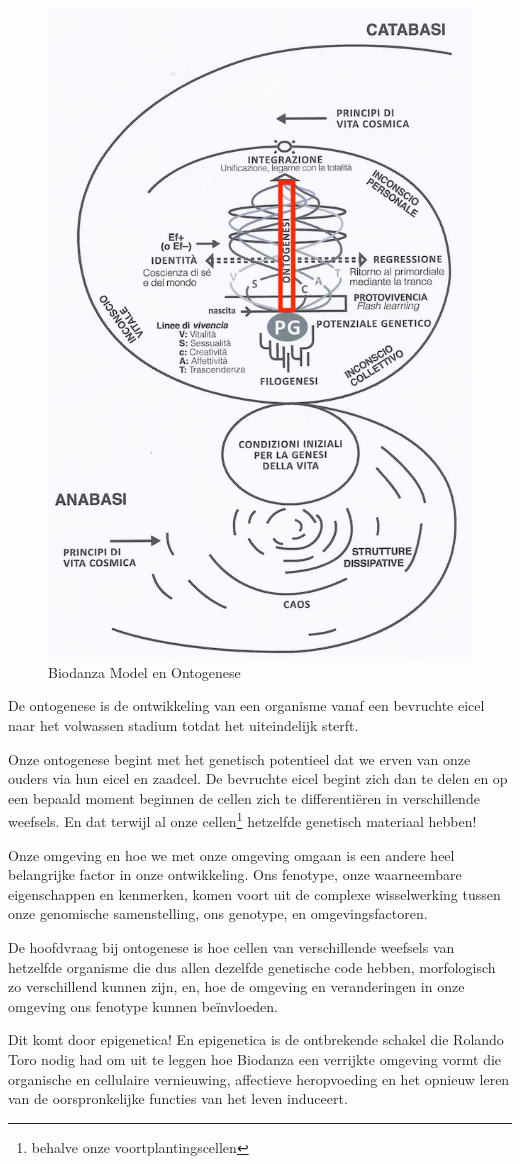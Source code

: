 \documentclass[
  11pt,
]{book}
\begin{document}
\begin{figure}

{\centering \includegraphics[width=0.5\linewidth]{./figs/biologischeAspectenBiodanzaDeelIII} 

}

\caption{Biodanza Model en Ontogenese}\label{fig:modelOnto}
\end{figure}

De ontogenese is de ontwikkeling van een organisme vanaf een bevruchte eicel naar het volwassen stadium totdat het uiteindelijk sterft.

Onze ontogenese begint met het genetisch potentieel dat we erven van onze ouders via hun eicel en zaadcel. De bevruchte eicel begint zich dan te delen en op een bepaald moment beginnen de cellen zich te differentiëren in verschillende weefsels.
En dat terwijl al onze cellen\footnote{behalve onze voortplantingscellen} hetzelfde genetisch materiaal hebben!

Onze omgeving en hoe we met onze omgeving omgaan is een andere heel belangrijke factor in onze ontwikkeling. Ons fenotype, onze waarneembare eigenschappen en kenmerken, komen voort uit de complexe wisselwerking tussen onze genomische samenstelling, ons genotype, en omgevingsfactoren.

De hoofdvraag bij ontogenese is hoe cellen van verschillende weefsels van hetzelfde organisme die dus allen dezelfde genetische code hebben, morfologisch zo verschillend kunnen zijn, en, hoe de omgeving en veranderingen in onze omgeving ons fenotype kunnen beïnvloeden.

Dit komt door epigenetica! En epigenetica is de ontbrekende schakel die Rolando Toro nodig had om uit te leggen hoe Biodanza een verrijkte omgeving vormt die organische en cellulaire vernieuwing, affectieve heropvoeding en het opnieuw leren van de oorspronkelijke functies van het leven induceert.
\end{document}
